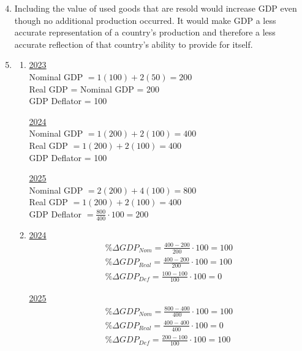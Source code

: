 \documentclass{article}
\begin{document}
\begin{enumerate}

\setcounter{enumi}{3}
\item Including the value of used goods that are resold would increase GDP even though no additional production occurred. It would make GDP a less accurate representation of a country's production and therefore a less accurate reflection of that country's ability to provide for itself. 

\item 

	\begin{enumerate}
	
	\item 
		\underline{2023} \\
		Nominal GDP $= 1(100) + 2(50) = 200$ \\
		Real GDP = Nominal GDP = 200 \\
		GDP Deflator = 100
	
		\underline{2024} \\
		Nominal GDP $= 1(200) + 2(100) = 400$ \\
		Real GDP $= 1(200) + 2(100) = 400$ \\
		GDP Deflator = 100
	
		\underline{2025} \\
		Nominal GDP $= 2(200) + 4(100) = 800$ \\
		Real GDP $= 1(200) + 2(100) = 400$ \\
		GDP Deflator $= \frac{800}{400} \cdot 100 = 200$
		
	\item
		\underline{2024} \\
		\begin{gather*}
		\% \Delta GDP_{Nom} = \frac{400 - 200}{200} \cdot 100 = 100 \\
		\% \Delta GDP_{Real} = \frac{400 - 200}{200} \cdot 100 = 100 \\
		\% \Delta GDP_{Def} = \frac{100 - 100}{100} \cdot 100 = 0
		\end{gather*}
		
		\underline{2025} \\
		\begin{gather*}
		\% \Delta GDP_{Nom} = \frac{800 - 400}{400} \cdot 100 = 100 \\
		\% \Delta GDP_{Real} = \frac{400 - 400}{400} \cdot 100 = 0 \\
		\% \Delta GDP_{Def} = \frac{200 - 100}{100} \cdot 100 = 100
		\end{gather*}
		

\end{enumerate}
\end{enumerate}
\end{document}
